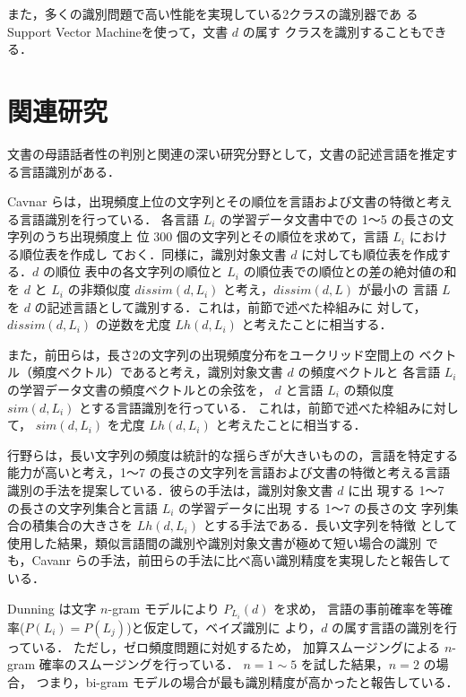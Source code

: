 \documentclass[japanese]{jnlp_1.4}
\begin{document}
また，多くの識別問題で高い性能を実現している2クラスの識別器であ
る Support Vector Machine\cite{パターン認識テキスト}を使って，文書 $d$ の属す
クラスを識別することもできる．

\section{関連研究}
\label{節：関連研究}

文書の母語話者性の判別と関連の深い研究分野として，文書の記述言語を推定す
る言語識別がある．

Cavnar らは，出現頻度上位の文字列とその順位を言語および文書の特徴と考え
る言語識別を行っている\cite{cavnar}．
各言語 $L_i$ の学習データ文書中での 1〜5 の長さの文字列のうち出現頻度上
位 300 個の文字列とその順位を求めて，言語 $L_i$ における順位表を作成し
ておく．同様に，識別対象文書 $d$ に対しても順位表を作成する．$d$ の順位
表中の各文字列の順位と $L_i$ の順位表での順位との差の絶対値の和を
$d$ と $L_i$ の非類似度 $dissim(d,L_i)$ と考え，$dissim(d,L)$ が最小の
言語 $L$を $d$ の記述言語として識別する．これは，前節で述べた枠組みに
対して，$dissim(d,L_i)$ の逆数を尤度 $Lh(d,L_i)$ と考えたことに相当する．

また，前田らは，長さ2の文字列の出現頻度分布をユークリッド空間上の
ベクトル（頻度ベクトル）であると考え，識別対象文書 $d$ の頻度ベクトルと
各言語 $L_i$ の学習データ文書の頻度ベクトルとの余弦を，
$d$ と言語 $L_i$ の類似度 $sim(d,L_i)$ とする言語識別を行っている\cite{前田}．
これは，前節で述べた枠組みに対して，
$sim(d,L_i)$ を尤度 $Lh(d,L_i)$ と考えたことに相当する．

行野らは，長い文字列の頻度は統計的な揺らぎが大きいものの，言語を特定する
能力が高いと考え，1〜7 の長さの文字列を言語および文書の特徴と考える言語
識別の手法を提案している\cite{行野}．彼らの手法は，識別対象文書 $d$ に出
現する 1〜7 の長さの文字列集合と言語 $L_i$ の学習データに出現
する 1〜7 の長さの文
字列集合の積集合の大きさを $Lh(d,L_i)$ とする手法である．長い文字列を特徴
として使用した結果，類似言語間の識別や識別対象文書が極めて短い場合の識別
でも，Cavanr らの手法，前田らの手法に比べ高い識別精度を実現したと報告している．

Dunning は文字 $n$-gram モデルにより $P_{L_i}(d)$ を求め，
言語の事前確率を等確率($P(L_i)=P(L_j)$)と仮定して，ベイズ識別に
より，$d$ の属す言語の識別を行っている\cite{dunning}．
ただし，ゼロ頻度問題に対処するため，
加算スムージングによる $n$-gram 確率のスムージングを行っている．
$n=1\sim 5$ を試した結果，$n=2$ の場合，
つまり，bi-gram モデルの場合が最も識別精度が高かったと報告している．
\end{document}

